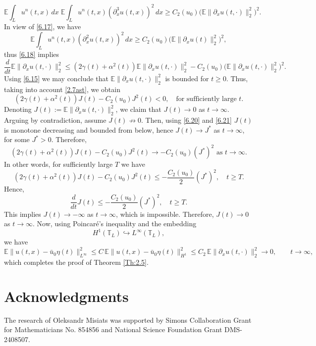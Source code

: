 \documentclass[a4paper,12pt]{article}
\numberwithin{equation}{section}
\def\d{\partial}
\begin{document}
\begin{equation*}\label{6.19}
\mathbb{E}\int_L u^n(t,x)\,dx \;
\mathbb{E}\int_L u^n(t,x) (\d_x^3 u(t,x))^2\,dx
\ge C_2(u_0)\bigl(\mathbb{E}\|\partial_x u(t,\cdot)\|_2^2\bigr)^2 .
\end{equation*}
In view of \eqref{6.17}, we have
\begin{equation*}
\mathbb{E}\int_L u^n(t,x)(\partial_x^2 u(t,x))^2\,dx
\ge C_2(u_0)\bigl(\mathbb{E}\|\partial_x u(t)\|_2^2\bigr)^2,
\end{equation*}
thus \eqref{6.18} implies
\begin{equation}\label{6.20}
\frac{d}{dt}\mathbb{E}\|\partial_x u(t, \cdot)\|_2^2
\le (2\gamma(t)+\alpha^2(t))\mathbb{E}\|\partial_x u(t,\cdot)\|_2^2
- C_2(u_0)\bigl(\mathbb{E}\|\partial_x u(t,\cdot)\|_2^2\bigr)^2.
\end{equation}
Using \eqref{6.15} we may conclude that 
$\mathbb{E}\|\partial_x u(t, \cdot)\|_2^2$ is bounded for $t\ge0$.
Thus, taking into account \eqref{2.7ast}, we obtain
\begin{equation}\label{6.21}
(2\gamma(t)+\alpha^2(t))J(t) - C_2(u_0)J^2(t) < 0,
\quad \text{for sufficiently large } t.
\end{equation}
Denoting $J(t):=\mathbb{E}\|\partial_x u(t, \cdot)\|_2^2$, we claim that
$J(t)\to 0$ as $t\to\infty$.
Arguing by contradiction, assume $J(t)\not\to 0$. Then, using \eqref{6.20} and \eqref{6.21} $J(t)$ is
monotone decreasing and bounded from below, hence $J(t)\to J^*$ as $t\to\infty$, for some $J^*>0$.
Therefore,
\[
(2\gamma(t)+\alpha^2(t))J(t) - C_2(u_0)J^2(t)
\to - C_2(u_0)(J^*)^2 \text{ as } t \to \infty.
\]
In other words, for sufficiently large $T$ we have 
\[
(2\gamma(t)+\alpha^2(t))J(t) - C_2(u_0)J^2(t)
\le -\frac{C_2(u_0)}{2}(J^*)^2,
\quad t\ge T .
\]
Hence,
\[
\frac{d}{dt}J(t)
\le -\frac{C_2(u_0)}{2}(J^*)^2,
\quad t\ge T .
\]
This implies $J(t)\to -\infty$ as $t\to\infty$, which is impossible.
Therefore, $J(t)\to 0$ as $t\to\infty$. 
Now, using Poincar\'e's inequality and the embedding
\[
H^1(\mathbb{T}_L) \hookrightarrow L^\infty(\mathbb{T}_L),
\]
we have
\begin{equation*}
\mathbb{E}\|u(t,x)-\bar u_0 \eta(t)\|_{L^\infty}^2
\le C\,\mathbb{E}\|u(t,x)-\bar u_0 \eta(t)\|_{H^1}^2 \le C_2\,\mathbb{E}\|\partial_x u(t, \cdot)\|_2^2
\longrightarrow 0,
\qquad t\to\infty,
\end{equation*}
which completes the proof of Theorem \ref{Th:2.5}.

\bigskip


\section*{Acknowledgments}  The research of Oleksandr Misiats was supported by Simons Collaboration
Grant for Mathematicians No. 854856 and National Science Foundation Grant DMS-2408507. \\
\end{document}
